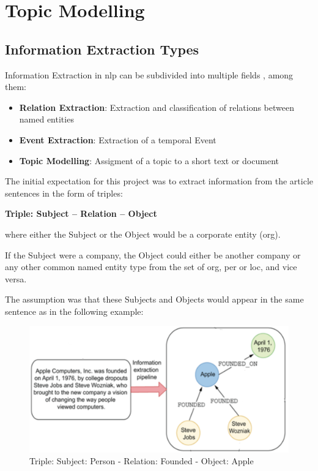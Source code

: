 \chapter{Topic Modelling}\label{ch:topic-modelling}
\section{Information Extraction Types}

Information Extraction in \gls{nlp} can be subdivided into multiple fields \cite{iebook}, among them:

\begin{itemize}
    \item \textbf{Relation Extraction}: Extraction and classification of relations between named entities
    \item \textbf{Event Extraction}: Extraction of a temporal Event
    \item \textbf{Topic Modelling}: Assigment of a topic to a short text or document
\end{itemize}

The initial expectation for this project was to extract information from the article sentences in the form of triples:

\begin{center}
\textbf{Triple: Subject – Relation – Object}
\end{center}

where either the Subject or the Object would be a corporate entity (\gls{org}).

If the Subject were a company, the Object could either be another company or any other common named entity type from the set of \gls{org}, \gls{per} or \gls{loc}, and vice versa.

The assumption was that these Subjects and Objects would appear in the same sentence as in the following example:
\begin{figure}[H]
    \centering
    \includegraphics[width=1.0\textwidth]{Assets/sub-pred-obj}
    \caption{Triple: Subject: Person - Relation: Founded - Object: Apple}
    \label{fig:triples}
\end{figure}

